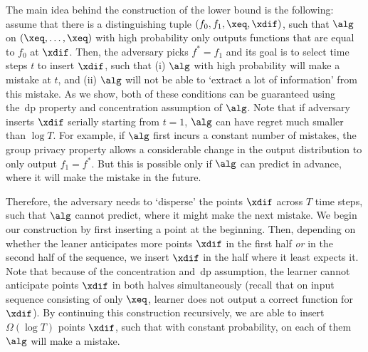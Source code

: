 The main idea behind the construction of the lower bound is the following: assume that there is a distinguishing tuple \((f_0, f_1, \xeq, \xdif)\), such that \(\alg\) on \((\xeq, \ldots, \xeq)\) with high probability only outputs functions that are equal to \(f_0\) at \(\xdif\). Then, the adversary picks \(f^* = f_1\) and its goal is to select time steps \(t\) to insert \(\xdif\), such that (i) \(\alg\) with high probability will make a mistake at \(t\), and (ii) \(\alg\) will not be able to `extract a lot of information' from this mistake. As we show, both of these conditions can be guaranteed using the~\Gls{dp} property and concentration assumption of \(\alg\).
Note that if adversary inserts \(\xdif\) serially starting from \(t = 1\), \(\alg\) can have regret much smaller than \(\log T\). For example, if \(\alg\) first incurs a constant number of mistakes, the group privacy property allows a considerable change in the output distribution to only output \(f_1 = f^*\). But this is possible only if \(\alg\) can predict in advance, where it will make the mistake in the future.

Therefore, the adversary needs to `disperse' the points \(\xdif\) across \(T\) time steps, such that \(\alg\) cannot predict, where it might make the next mistake. We begin our construction by first inserting a point at the beginning. Then, depending on whether the leaner anticipates more points \(\xdif\) in the first half \emph{or} in the second half of the sequence, we insert \(\xdif\) in the half where it least expects it. Note that because of the concentration and~\Gls{dp} assumption, the learner cannot anticipate points \(\xdif\) in both halves simultaneously (recall that on input sequence consisting of only \(\xeq\), learner does not output a correct function for \(\xdif\)). By continuing this construction recursively, we are able to insert \(\Omega(\log T)\) points \(\xdif\), such that with constant probability, on each of them \(\alg\) will make a mistake.


